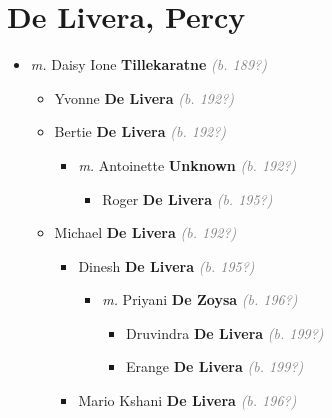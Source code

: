 \documentclass[10pt, openany]{book}
\begin{document}
\chapter{De Livera, Percy}
\label{00001224}
\textcolor{slmaroon}{\textit{}}
\begin{itemize}
\item{\textit{m.} Daisy Ione \textbf{Tillekaratne} \textcolor{gray}{\textit{(b. 189?)}}   \label{couple:00001224:00002295} \begin{itemize}
\item{Yvonne \textbf{De Livera} \textcolor{gray}{\textit{(b. 192?)}}
  }
\item{Bertie \textbf{De Livera} \textcolor{gray}{\textit{(b. 192?)}}
\begin{itemize}
\item{\textit{m.} Antoinette \textbf{Unknown} \textcolor{gray}{\textit{(b. 192?)}}   \label{couple:00001228:00002345} \begin{itemize}
\item{Roger \textbf{De Livera} \textcolor{gray}{\textit{(b. 195?)}}
  }
\end{itemize}}
\end{itemize}
  }
\item{Michael \textbf{De Livera} \textcolor{gray}{\textit{(b. 192?)}}
\begin{itemize}
\item{Dinesh \textbf{De Livera} \textcolor{gray}{\textit{(b. 195?)}}
\begin{itemize}
\item{\textit{m.} Priyani \textbf{De Zoysa} \textcolor{gray}{\textit{(b. 196?)}}   \label{couple:00002297:00002298} \begin{itemize}
\item{Druvindra \textbf{De Livera} \textcolor{gray}{\textit{(b. 199?)}}
  }
\item{Erange \textbf{De Livera} \textcolor{gray}{\textit{(b. 199?)}}
  }
\end{itemize}}
\end{itemize}
  }
\item{Mario Kshani \textbf{De Livera} \textcolor{gray}{\textit{(b. 196?)}}
   }
\end{itemize}
  }

\end{itemize}}
\end{itemize}
\end{document}
